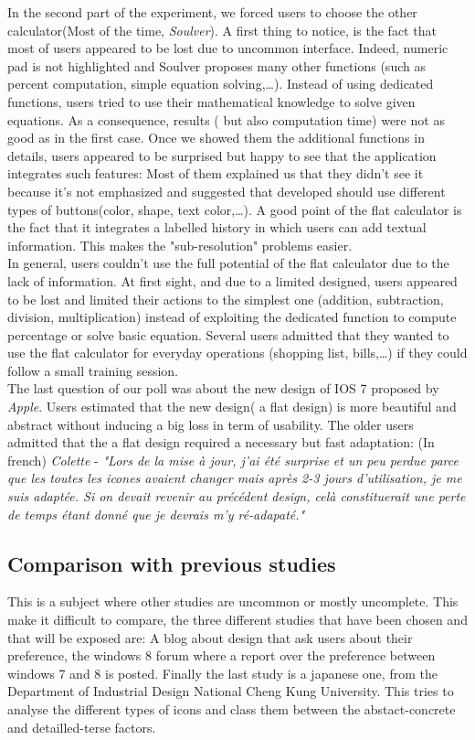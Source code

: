 \documentclass[a4paper,11pt] {article}
\theoremstyle{definition}
\begin{document}
    In the second part of the experiment, we forced users to choose the other calculator(Most of the time, \textit{Soulver}). A first thing to notice, is the fact that most of users appeared to be lost due to uncommon interface. Indeed, numeric pad is not highlighted and Soulver proposes many other functions (such as percent computation, simple equation solving,\ldots). Instead of using dedicated functions, users tried to use their mathematical knowledge to solve given equations. As a consequence, results ( but also computation time) were not as good as in the first case. Once we showed them the additional functions in details, users appeared to be surprised but happy to see that the application integrates such features: Most of them explained us that they didn't see it because it's not emphasized and suggested that developed should use different types of buttons(color, shape, text color,\ldots). A good point of the flat calculator is the fact that it integrates a labelled history in which users can add textual information. This makes the "sub-resolution" problems easier.\\
    
    In general, users couldn't use the full potential of the flat calculator due to the lack of information. At first sight, and due to a limited designed, users appeared to be lost and limited their actions to the simplest one (addition, subtraction, division, multiplication) instead of exploiting the dedicated function to compute percentage or solve basic equation. Several users admitted that they wanted to use the flat calculator for everyday operations (shopping list, bills,\ldots) if they could follow a small training session.\\
    
    The last question of our poll was about the new design of IOS 7 proposed by \textit{Apple}.
    Users estimated that the new design( a flat design) is more beautiful and abstract without inducing a big loss in term of 	usability. The older users admitted that the a flat design required a necessary but fast adaptation:
  	(In french) \textit{Colette} - \textit{"Lors de la mise à jour, j'ai été surprise et un peu perdue parce que les toutes les icones avaient changer mais après 2-3 jours d'utilisation, je me suis adaptée. Si on devait revenir au précédent design, celà constituerait une perte de temps étant donné que je devrais m'y ré-adapaté."}
    
    

    \subsection{Comparison with previous studies}
    This is a subject where other studies are uncommon or mostly uncomplete. This make it difficult to compare, the three different studies that have been chosen and that will be exposed are: A blog about design that ask users about their preference, the windows 8 forum where a report over the preference between windows 7 and 8 is posted. Finally the last study is a japanese one, from the Department of Industrial Design National Cheng Kung University. This tries to analyse the different types of icons and class them between the abstact-concrete and detailled-terse factors.
\end{document}
